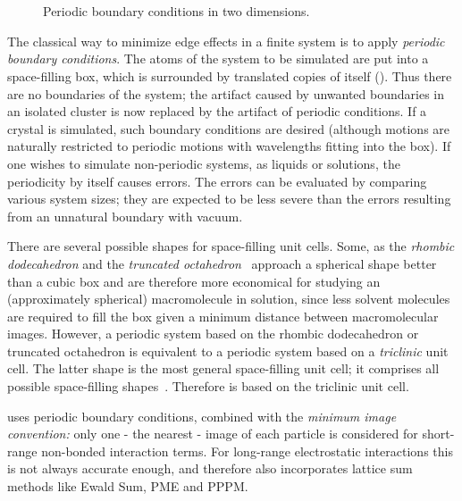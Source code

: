 \section{}
\label{sec:pbc}
\begin{figure}
\centerline{}
\caption {Periodic boundary conditions in two dimensions.}
\label{fig:pbc}
\end{figure}
The classical way to minimize edge effects in a finite system is to
apply {\em periodic boundary conditions}. The atoms of the system to be simulated are put into a space-filling box, which is
surrounded by translated copies of itself (). 
Thus there are no
boundaries of the system; the artifact caused by unwanted
boundaries in an isolated cluster is now replaced by the artifact of
periodic conditions. If a crystal is simulated, such boundary conditions
are desired (although motions are naturally restricted to periodic
motions with wavelengths fitting into the box). If one wishes to
simulate  non-periodic systems, as liquids or solutions, the
periodicity by  itself causes errors. The errors can be evaluated by
comparing various system sizes; they are expected to be less severe than
the errors resulting from an unnatural boundary with vacuum.

There are several possible shapes for space-filling unit cells. Some,
as the {\em rhombic dodecahedron} and the 
{\em truncated octahedron}~\cite{Adams79} approach a spherical
shape better than a cubic box and are therefore more economical for
studying an (approximately spherical) macromolecule in solution, since
less solvent molecules are required to fill the box given a minimum
distance between macromolecular images. However, a periodic system
based on the rhombic dodecahedron or truncated octahedron is equivalent
to a periodic system based on a {\em triclinic} unit cell.
The latter shape is the most general space-filling unit cell;
it comprises all possible space-filling shapes~\cite{Bekker95}.
Therefore {\gromacs} is based on the triclinic unit cell.
  
{\gromacs} uses periodic boundary conditions, combined with the {\em
minimum image convention:} only one - the nearest - image of each
particle is considered for short-range non-bonded interaction terms.
For long-range electrostatic interactions this is not always accurate
enough, and {\gromacs} therefore also incorporates lattice sum methods
like Ewald Sum, PME and PPPM.

